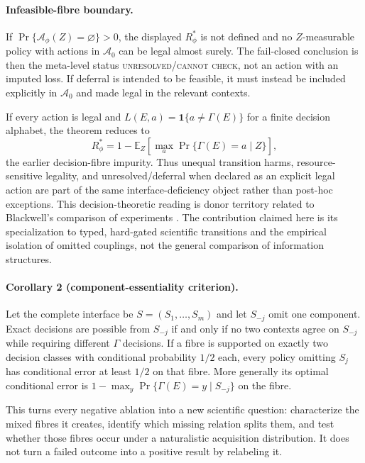 \paragraph{Infeasible-fibre boundary.}
If $\Pr\{\mathcal A_\phi(Z)=\varnothing\}>0$, the displayed $R_\phi^*$ is not
defined and no $Z$-measurable policy with actions in $\mathcal A_0$ can be
legal almost surely. The fail-closed conclusion is then the meta-level status
\textsc{unresolved}/\textsc{cannot check}, not an action with an imputed loss.
If deferral is intended to be feasible, it must instead be included explicitly
in $\mathcal A_0$ and made legal in the relevant contexts.

If every action is legal and $L(E,a)=\mathbf 1\{a\neq\Gamma(E)\}$ for a finite
decision alphabet, the theorem reduces to
\[
 R_\phi^*=1-\mathbb E_Z\!\left[
   \max_a\Pr\{\Gamma(E)=a\mid Z\}
 \right],
\]
the earlier decision-fibre impurity. Thus unequal transition harms,
resource-sensitive legality, and unresolved/deferral when declared as an
explicit legal action are part of
the same interface-deficiency object rather than post-hoc exceptions. This
decision-theoretic reading is donor territory related to Blackwell's
comparison of experiments \cite{blackwell1953}. The contribution claimed here
is its specialization to typed, hard-gated scientific transitions and the
empirical isolation of omitted couplings, not the general comparison of
information structures.

\paragraph{Corollary 2 (component-essentiality criterion).}
Let the complete interface be $S=(S_1,\ldots,S_m)$ and let $S_{-j}$ omit one
component. Exact decisions are possible from $S_{-j}$ if and only if no two
contexts agree on $S_{-j}$ while requiring different $\Gamma$ decisions. If a
fibre is supported on exactly two decision classes with conditional probability
$1/2$ each, every policy omitting $S_j$ has conditional error at least $1/2$
on that fibre. More generally its optimal conditional error is
$1-\max_y\Pr\{\Gamma(E)=y\mid S_{-j}\}$ on the fibre.

This turns every negative ablation into a new scientific question: characterize
the mixed fibres it creates, identify which missing relation splits them, and
test whether those fibres occur under a naturalistic acquisition distribution.
It does not turn a failed outcome into a positive result by relabeling it.

